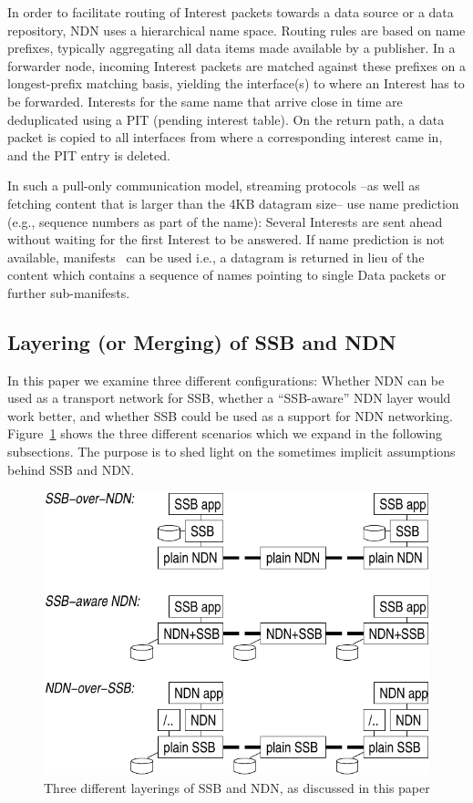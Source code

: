 \documentclass[9pt,sigconf,rewiew]{acmart}
\begin{document}
In order to facilitate routing of Interest packets towards a data
source or a data repository, NDN uses a hierarchical name
space. Routing rules are based on name prefixes, typically aggregating
all data items made available by a publisher. In a forwarder node,
incoming Interest packets are matched against these prefixes on a
longest-prefix matching basis, yielding the interface(s) to where an
Interest has to be forwarded. Interests for the same name that arrive
close in time are deduplicated using a PIT (pending interest
table). On the return path, a data packet is copied to all interfaces
from where a corresponding interest came in, and the PIT entry is
deleted.

In such a pull-only communication model, streaming protocols --as well
as fetching content that is larger than the 4KB datagram size-- use
name prediction (e.g., sequence numbers as part of the name): Several
Interests are sent ahead without waiting for the first Interest to be
answered. If name prediction is not available,
manifests~\cite{DBLP:conf/infocom/BaugherDNO12} can be used i.e., a datagram is returned in
lieu of the content which contains a sequence of names pointing to
single Data packets or further sub-manifests.

\subsection{Layering (or Merging) of SSB and NDN}

In this paper we examine three different configurations: Whether NDN
can be used as a transport network for SSB, whether a ``SSB-aware''
NDN layer would work better, and whether SSB could be used as a
support for NDN networking. Figure~\ref{fig:ssb-and-ndn} shows the
three different scenarios which we expand in the following
subsections. The purpose is to shed light on the sometimes implicit
assumptions behind SSB and NDN.

\begin{figure}[htb]
  \raggedright
  \includegraphics[width=0.9\columnwidth]{figs/ssb-and-ndn.pdf}
  \caption{\label{fig:ssb-and-ndn}Three different layerings of SSB and NDN,
    as discussed in this paper}
\end{figure}
\end{document}
